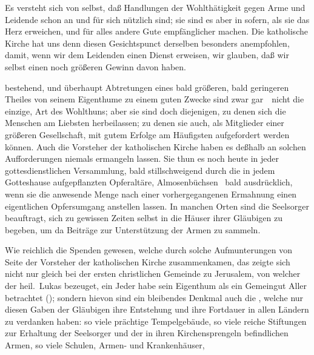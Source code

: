 \begin{aufza}
\item Es versteht sich von selbst, daß Handlungen der Wohlthätigkeit gegen Arme und Leidende schon an und für sich nützlich sind; sie sind es aber  in sofern, als sie das Herz erweichen, und für alles andere Gute empfänglicher machen. Die katholische Kirche hat uns denn diesen Gesichtspunct derselben besonders anempfohlen, damit, wenn wir dem Leidenden einen Dienst erweisen, wir glauben, daß wir selbst einen noch größeren Gewinn davon haben.
\item {} bestehend, und überhaupt Abtretungen eines bald größeren, bald geringeren Theiles von seinem Eigenthume zu einem guten Zwecke sind zwar gar~\ nicht die einzige,  Art des Wohlthuns; aber sie sind doch diejenigen, zu denen sich die Menschen am Liebsten herbeilassen; zu denen sie auch, als Mitglieder einer größeren Gesellschaft, mit gutem Erfolge am Häufigsten aufgefordert werden können. Auch die Vorsteher der katholischen Kirche haben es deßhalb an solchen Aufforderungen niemals ermangeln lassen. Sie thun es noch heute in jeder gottesdienstlichen Versammlung, bald stillschweigend durch die in jedem Gotteshause aufgepflanzten Opferaltäre, Almosenbüchsen \udgl\  bald ausdrücklich, wenn sie die anwesende Menge nach einer vorhergegangenen Ermahnung einen eigentlichen Opfersumgang anstellen lassen. In manchen Orten sind die Seelsorger beauftragt, sich zu gewissen Zeiten selbst in die Häuser ihrer Gläubigen zu begeben, um da Beiträge zur Unterstützung der Armen zu sammeln.
\item Wie reichlich die Spenden gewesen, welche durch solche Aufmunterungen von Seite der Vorsteher der katholischen Kirche zusammenkamen, das zeigte sich nicht nur gleich bei der ersten christlichen Gemeinde zu Jerusalem, von welcher der heil.\ Lukas bezeuget, ein Jeder habe sein Eigenthum als ein Gemeingut Aller betrachtet (); sondern hievon sind ein bleibendes Denkmal auch die , welche nur diesen Gaben der Gläubigen ihre Entstehung und ihre Fortdauer in allen Ländern zu verdanken haben: so viele prächtige Tempelgebäude, so viele reiche Stiftungen zur Erhaltung der Seelsorger und der in ihren Kirchensprengeln befindlichen Armen, so viele Schulen, Armen- und Krankenhäuser, \usw\ \usw\
\end{aufza}

